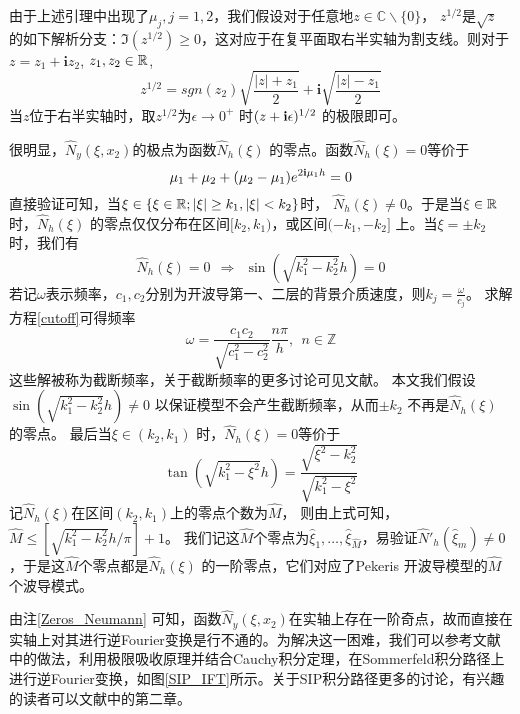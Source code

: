 \begin{remark}
由于上述引理中出现了$\mu_j,j=1,2$，我们假设对于任意地$z\in \mathbb{C}\backslash\{0\}$， $z^{1/2}$是$\sqrt{z}$ 的如下解析分支：$\Im(z^{1/2})\geq 0$，这对应于在复平面取右半实轴为割支线。则对于$z=z_1+\mathbf{i}z_2$, $z_1,z_2\in\mathbb{R}$,
\begin{equation}\label{branch}
  z^{1/2}=sgn(z_2)\sqrt{\frac{|z|+z_1}{2}}+\mathbf{i}\sqrt{\frac{|z|-z_1}{2}}
\end{equation}
当$z$位于右半实轴时，取$z^{1/2}$为$\epsilon\rightarrow0^+$ 时$(z+\mathbf{i}\epsilon)^{1/2}$ 的极限即可。
\end{remark}
\begin{remark}\label{Zeros_Neumann}
很明显，$\hat{N}_y(\xi,x_2)$的极点为函数$\hat N_h(\xi)$ 的零点。函数$\hat N_h(\xi)=0$等价于
\begin{equation}
  \mu_1+\mu_2+(\mu_2-\mu_1)e^{2\mathbf{i}\mu_1h}=0
\end{equation}
直接验证可知，当$\xi\in\{\xi\in\mathbb{R};|\xi|\geq k_1,|\xi|<k_2\}$时，
$\hat N_h(\xi)\neq0$。于是当$\xi\in\mathbb{R}$时，$\hat N_h(\xi)$ 的零点仅仅分布在区间$[k_2,k_1)$，或区间$(-k_1,-k_2]$ 上。当$\xi=\pm k_2$ 时，我们有
\begin{equation}\label{cutoff}
  \hat N_h(\xi)=0\ \ \Rightarrow\ \ \sin\left(\sqrt{k_1^2-k_2^2}h\right)=0
\end{equation}
若记$\omega$表示频率，$c_1,c_2$分别为开波导第一、二层的背景介质速度，则$k_j=\frac{\omega}{c_j}$。 求解方程\eqref{cutoff}可得频率
\begin{equation}
\omega=\frac{c_1c_2}{\sqrt{c_1^2-c_2^2}}\frac{n\pi}{h},\ \ n\in\mathbb{Z}
\end{equation}
这些解被称为截断频率，关于截断频率的更多讨论可见文献\cite{Katsnelson2012Fundamentals,Kuperman2011Computational}。 本文我们假设$\sin\left(\sqrt{k_1^2-k_2^2}h\right)\neq0$ 以保证模型不会产生截断频率，从而$\pm k_2$ 不再是$\hat N_h(\xi)$ 的零点。
最后当$\xi\in(k_2,k_1)$ 时，$\hat N_h(\xi)=0$等价于
\begin{equation}
  \tan{\left(\sqrt{k_1^2-\xi^2}h\right)}=\frac{\sqrt{\xi^2-k_2^2}}{\sqrt{k_1^2-\xi^2}}
\end{equation}
记$\hat N_h(\xi)$在区间$(k_2,k_1)$上的零点个数为$\hat M$， 则由上式可知，
$\hat M\leq\left[\sqrt{k_1^2-k_2^2}h/\pi\right]+1$。 我们记这$\hat M$个零点为$\hat\xi_1,\ldots,\hat\xi_{\hat M}$，易验证$\hat N'_h(\hat\xi_m)\neq0$，于是这$\hat M$个零点都是$\hat N_h(\xi)$ 的一阶零点，它们对应了Pekeris 开波导模型的$\hat M$ 个波导模式。
\end{remark}
由注\ref{Zeros_Neumann} 可知，函数$\hat N_y(\xi,x_2)$在实轴上存在一阶奇点，故而直接在实轴上对其进行逆Fourier变换是行不通的。为解决这一困难，我们可以参考文献\cite{cz2010,Chew1995Waves,Desanto1992Scalar,thesis_guanghui} 中的做法，利用极限吸收原理并结合Cauchy积分定理，在Sommerfeld积分路径上进行逆Fourier变换，如图\ref{SIP_IFT}所示。关于SIP积分路径更多的讨论，有兴趣的读者可以文献\cite{Chew1995Waves}中的第二章。

